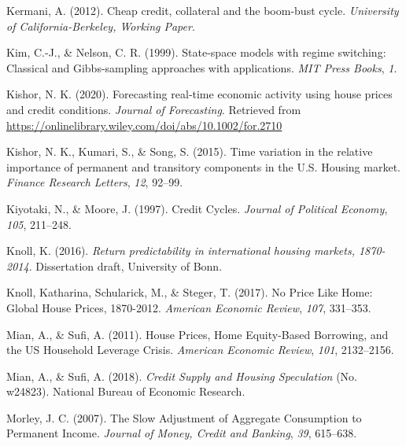 \documentclass[
  12pt,
]{article}
\newlength{\cslhangindent}
\newlength{\cslentryspacingunit} %
\newenvironment{CSLReferences}[2] %
 {%
  \setlength{\parindent}{0pt}
  \ifodd #1
  \let\oldpar\par
  \def\par{\hangindent=\cslhangindent\oldpar}
  \fi
  \setlength{\parskip}{#2\cslentryspacingunit}
 }%
 {}
\begin{document}
\begin{CSLReferences}{1}{0}
\leavevmode{}%
Kermani, A. (2012). Cheap credit, collateral and the boom-bust cycle. \emph{University of California-Berkeley, Working Paper}.

\leavevmode{}%
Kim, C.-J., \& Nelson, C. R. (1999). State-space models with regime switching: Classical and {Gibbs}-sampling approaches with applications. \emph{MIT Press Books}, \emph{1}.

\leavevmode{}%
Kishor, N. K. (2020). Forecasting real‐time economic activity using house prices and credit conditions. \emph{Journal of Forecasting}. Retrieved from \url{https://onlinelibrary.wiley.com/doi/abs/10.1002/for.2710}

\leavevmode{}%
Kishor, N. K., Kumari, S., \& Song, S. (2015). Time variation in the relative importance of permanent and transitory components in the {U}.{S}. Housing market. \emph{Finance Research Letters}, \emph{12}, 92--99.

\leavevmode{}%
Kiyotaki, N., \& Moore, J. (1997). Credit {Cycles}. \emph{Journal of Political Economy}, \emph{105}, 211--248.

\leavevmode{}%
Knoll, K. (2016). \emph{Return predictability in international housing markets, 1870-2014}. {Dissertation draft, University of Bonn}.

\leavevmode{}%
Knoll, Katharina, Schularick, M., \& Steger, T. (2017). No {Price Like Home}: Global {House Prices}, 1870-2012. \emph{American Economic Review}, \emph{107}, 331--353.

\leavevmode{}%
Mian, A., \& Sufi, A. (2011). House {Prices}, {Home Equity}-{Based Borrowing}, and the {US Household Leverage Crisis}. \emph{American Economic Review}, \emph{101}, 2132--2156.

\leavevmode{}%
Mian, A., \& Sufi, A. (2018). \emph{Credit {Supply} and {Housing Speculation}} (No. w24823). {National Bureau of Economic Research}.

\leavevmode{}%
Morley, J. C. (2007). The {Slow Adjustment} of {Aggregate Consumption} to {Permanent Income}. \emph{Journal of Money, Credit and Banking}, \emph{39}, 615--638.


\end{CSLReferences}
\end{document}
